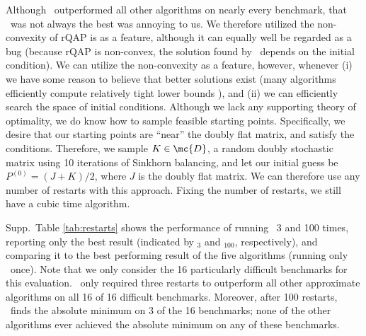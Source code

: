\documentclass{article} %
\begin{document}
Although \FAQ\ outperformed all other algorithms on nearly every benchmark, that \FAQ\  was not always the best was annoying to us.
% 
We therefore utilized the non-convexity of rQAP is as a feature, although it can equally well be regarded as a bug  (because rQAP is non-convex, the solution found by \FAQ\  depends on the initial condition).  We can utilize the non-convexity as a feature, however, whenever (i) we have some reason to believe that better solutions exist (many algorithms efficiently compute relatively tight lower bounds \cite{Anstreicher2009}), and (ii) we can efficiently search the space of initial conditions.  Although we lack any supporting theory of optimality, we do know how to sample feasible starting points.  Specifically, we desire that our starting points are ``near'' the doubly flat matrix, and satisfy the conditions.  Therefore, we  sample $K \in \mc{D}$, a random doubly stochastic matrix using 10 iterations of Sinkhorn balancing, and let our initial guess be $P^{(0)}=(J+K)/2$, where $J$ is the doubly flat matrix.  We can therefore use any number of restarts with this approach.  Fixing the number of restarts, we still have a cubic time algorithm. %

Supp.\  Table \ref{tab:restarts} shows the performance of running \FAQ\  3 and 100 times, reporting only the best result (indicated by \FAQ$_3$ and \FAQ$_{100}$, respectively), and comparing it to the best performing result of the five algorithms (running only \FAQ\  once). Note that we only consider the 16 particularly difficult benchmarks for this evaluation. \FAQ\  only required three restarts to outperform all other approximate algorithms on all 16 of 16 difficult benchmarks.  Moreover, after 100 restarts, \FAQ\  finds the absolute minimum on 3 of the 16 benchmarks; none of the other algorithms ever achieved the absolute minimum on any of these benchmarks. 
\end{document}
